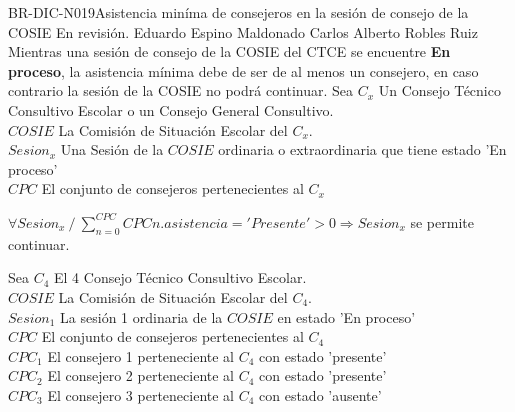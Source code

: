 \begin{BusinessRule}{BR-DIC-N019}{Asistencia miníma de consejeros en la sesión de consejo de la COSIE}
	{\bcCondition}    %
	{\btEnabler}     %
	{\blControlling}    %
	\BRItem[Estado] En revisión.
	 Eduardo Espino Maldonado
	 Carlos Alberto Robles Ruiz
	\BRItem[Descripción] Mientras una sesión de consejo de la COSIE del CTCE se encuentre \textbf{En proceso}, la asistencia mínima debe de ser de al menos un consejero, en caso contrario la sesión de la COSIE no podrá continuar.
	\BRItem[Sentencia]
Sea $ C_{x}$ Un Consejo Técnico Consultivo Escolar o un Consejo General Consultivo.\\
$COSIE$ La Comisión de Situación Escolar del $ C_{x}$.\\
$Sesion_{x}$ Una Sesión de la $COSIE$ ordinaria o extraordinaria que tiene estado 'En proceso' \\
 $CPC$ El conjunto de consejeros pertenecientes al $C_{x}$ \\ 
	\begin{center}
			$  \forall Sesion_{x} \: / \: \sum_{n=0}^{CPC}CPC{n}.{asistencia='Presente'} > 0 \Rightarrow Sesion_{x}$ se permite continuar.
	\end{center}
	
	Sea $ C_{4}$ El 4 Consejo Técnico Consultivo Escolar.\\
	$COSIE$ La Comisión de Situación Escolar del $ C_{4}$.\\
	$Sesion_{1}$ La sesión 1 ordinaria  de la $COSIE$ en estado 'En proceso' \\
	$CPC$ El conjunto de consejeros pertenecientes al $C_{4}$ \\ 
	$CPC_{1}$ El consejero 1 perteneciente al $C_{4}$ con estado 'presente'\\ 
	$CPC_{2}$ El consejero 2 perteneciente al $C_{4}$ con estado 'presente'\\ 
	$CPC_{3}$ El consejero 3 perteneciente al $C_{4}$ con estado 'ausente'\\ 
	

\end{BusinessRule}
